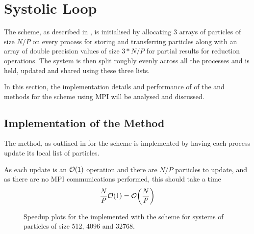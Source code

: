 \section{Systolic Loop}

The \systolicloop{} scheme, as described in
,
is initialised by allocating 3 arrays of particles of
size $N/P$ on every process for storing and transferring particles
along with an array of double precision values of size $3*N/P$ for
partial results for reduction operations.
%
The system is then split roughly evenly across all the processes
and is held, updated and shared using these three lists.

In this section, the implementation details and performance of
of the \individualoperation{} and \pairoperation{} methods
for the \systolicloop{} scheme using MPI will be analysed and discussed.


%
%

\subsection{Implementation of the \individualoperation{} Method}

The \individualoperation{} method, as outlined in
for the \systolicloop{} scheme
is implemented by having each process update its local list of particles.

As each update is an $\mathcal{O}{\left({ 1 }\right)}$ operation and there are $N/P$ particles
to update, and as there are no MPI communications performed,
this should take a time
\begin{equation}
    \frac{N}{P}\mathcal{O}{\left({ 1 }\right)} = \mathcal{O}{\left({ \frac{N}{P} }\right)}
\end  {equation}

%
%
\begin{figure}[!h]
    
    \caption{
        Speedup plots for the \individualoperation{} implemented with the \systolicloop{} scheme for systems of particles of size 512, 4096 and 32768.
    }
    \label{fig:v0_systolic_individual_operation_speedups}
\end{figure}


%
%
\begin{figure}[!h]
    
    \caption{}
    \label{fig:v0_systolic_individual_operation_512_logtime}
\end  {figure}

